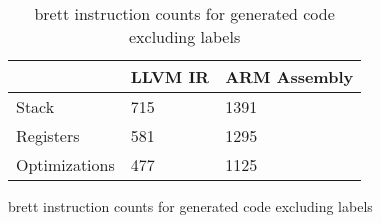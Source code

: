 \begin{table}[h!]
\centering
\begin{tabular}{p{}p{}p{}}
  \hline
 & LLVM IR & ARM Assembly \\ 
  \hline
Stack & 715 & 1391 \\ 
  Registers & 581 & 1295 \\ 
  Optimizations & 477 & 1125 \\ 
   \hline
\end{tabular}
\caption{brett instruction counts for generated code excluding labels}
\caption{brett instruction counts for generated code excluding labels}
\end{table}
